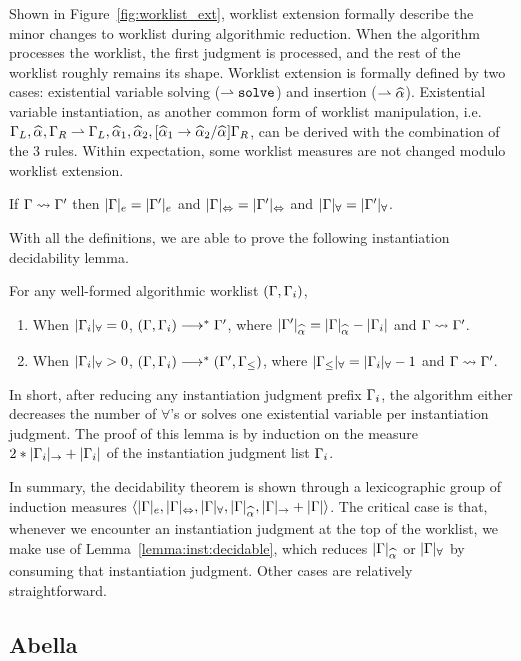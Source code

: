 Shown in Figure~\ref{fig:worklist_ext},
worklist extension formally describe the minor changes to worklist during algorithmic reduction.
When the algorithm processes the worklist, the first judgment is processed,
and the rest of the worklist roughly remains its shape.
Worklist extension is formally defined by two cases:
existential variable solving ($\mathtt{\rightharpoonup solve}$) and insertion ($\mathtt{\jExt \al}$).
Existential variable instantiation, as another common form of worklist manipulation,
i.e. $\Gm_L,\al,\Gm_R \jExt \Gm_L, \al[1], \al[2], [\al[1] \to \al[2] / \al]\Gm_R$,
can be derived with the combination of the 3 rules.
Within expectation, some worklist measures are not changed modulo worklist extension.

\newcommand{\equivGm}[1]{|\Gm|_{#1} = |\Gm'|_{#1}}
\begin{lemma}
If $\Gamma\rightsquigarrow\Gamma'$ then $\equivGm{e}$ and $\equivGm\Leftrightarrow$ and $\equivGm\forall$.
\end{lemma}

With all the definitions, we are able to prove the following instantiation decidability lemma.

\begin{lemma}\label{lemma:inst:decidable}
For any well-formed algorithmic worklist $(\Gamma, \Gamma_i)$,
\begin{enumerate}[1)]
    \item When $|\Gamma_i|_\forall = 0$, $(\Gamma, \Gamma_i) \longrightarrow^* \Gamma'$,
        where $|\Gm'|_{\al} = |\Gm|_{\al} - |\Gm_i|$ and $\Gamma\rightsquigarrow\Gamma'$.
    \item When $|\Gamma_i|_\forall > 0$, $(\Gamma, \Gamma_i) \longrightarrow^* (\Gamma', \Gamma_\le)$,
        where $|\Gamma_\le|_\forall = |\Gamma_i|_\forall - 1$ and $\Gamma\rightsquigarrow\Gamma'$.
\end{enumerate}
\end{lemma}

In short, after reducing any instantiation judgment prefix $\Gamma_i$,
the algorithm either decreases the number of $\forall$'s
or solves one existential variable per instantiation judgment.
The proof of this lemma is by induction on the measure $2*|\Gamma_i|_\to + |\Gamma_i|$
of the instantiation judgment list $\Gamma_i$.

In summary, the decidability theorem is shown through a lexicographic group of induction measures
$\langle |\Gm|_e, |\Gm|_\Leftrightarrow, |\Gm|_\forall, |\Gm|_{\al}, |\Gm|_\to + |\Gm| \rangle$.
The critical case is that, whenever we encounter an instantiation judgment at the top of the worklist,
we make use of Lemma~\ref{lemma:inst:decidable}, which reduces $|\Gm|_{\al}$ or $|\Gamma|_\forall$
by consuming that instantiation judgment. Other cases are relatively straightforward.

\subsection{Abella}
